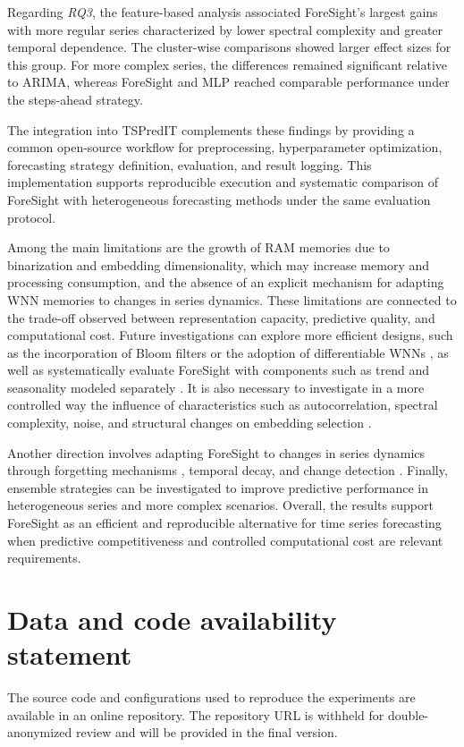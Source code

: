 \documentclass[final,3p,times,twocolumn,authoryear]{elsarticle}
\begin{document}
Regarding \textit{RQ3}, the feature-based analysis associated ForeSight's largest gains with more regular series characterized by lower spectral complexity and greater temporal dependence. The cluster-wise comparisons showed larger effect sizes for this group. For more complex series, the differences remained significant relative to ARIMA, whereas ForeSight and MLP reached comparable performance under the steps-ahead strategy.

The integration into TSPredIT complements these findings by providing a common open-source workflow for preprocessing, hyperparameter optimization, forecasting strategy definition, evaluation, and result logging. This implementation supports reproducible execution and systematic comparison of ForeSight with heterogeneous forecasting methods under the same evaluation protocol.

Among the main limitations are the growth of RAM memories due to binarization and embedding dimensionality, which may increase memory and processing consumption, and the absence of an explicit mechanism for adapting WNN memories to changes in series dynamics. These limitations are connected to the trade-off observed between representation capacity, predictive quality, and computational cost. Future investigations can explore more efficient designs, such as the incorporation of Bloom filters \citep{susskind_weightless_2022} or the adoption of differentiable WNNs \citep{bacellar_differentiable_2024}, as well as systematically evaluate ForeSight with components such as trend and seasonality modeled separately \citep{hyndman_forecasting_2021}. It is also necessary to investigate in a more controlled way the influence of characteristics such as autocorrelation, spectral complexity, noise, and structural changes on embedding selection \citep{fulcher_highly_2014}.

Another direction involves adapting ForeSight to changes in series dynamics through forgetting mechanisms \citep{cardoso_clustering_2016}, temporal decay, and change detection \citep{ogasawara_event_2025}. Finally, ensemble strategies \citep{lusquino_extending_2020} can be investigated to improve predictive performance in heterogeneous series and more complex scenarios. Overall, the results support ForeSight as an efficient and reproducible alternative for time series forecasting when predictive competitiveness and controlled computational cost are relevant requirements.

\section*{Data and code availability statement}
The source code and configurations used to reproduce the experiments are available in an online repository. The repository URL is withheld for double-anonymized review and will be provided in the final version.
\end{document}
